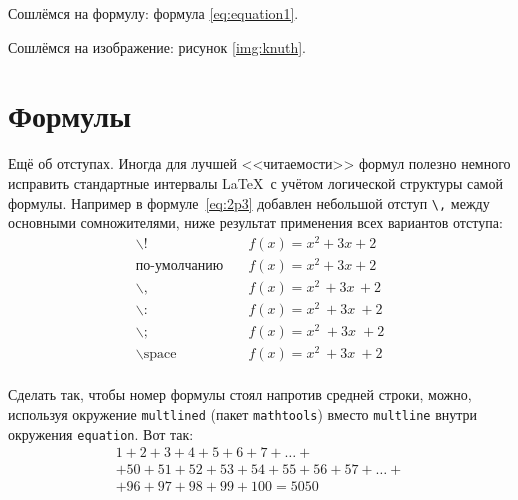 Сошлёмся на формулу: формула \eqref{eq:equation1}.

Сошлёмся на изображение: рисунок \ref{img:knuth}.


\section{Формулы} \label{sect1_3}


Ещё об отступах. Иногда для лучшей <<читаемости>> формул полезно
немного исправить стандартные интервалы \LaTeX\ с учётом логической
структуры самой формулы. Например в формуле~\ref{eq:2p3} добавлен
небольшой отступ \verb+\,+ между основными сомножителями, ниже
результат применения всех вариантов отступа:
\begin{align*}
\backslash! &\quad f(x) = x^2\! +3x\! +2 \\
  \mbox{по-умолчанию} &\quad f(x) = x^2+3x+2 \\
\backslash, &\quad f(x) = x^2\, +3x\, +2 \\
\backslash{:} &\quad f(x) = x^2\: +3x\: +2 \\
\backslash; &\quad f(x) = x^2\; +3x\; +2 \\
\backslash \mbox{space} &\quad f(x) = x^2\ +3x\ +2 \\
\end{align*}


Сделать так, чтобы номер формулы стоял напротив средней строки, можно, используя окружение \verb|multlined| (пакет \verb|mathtools|) вместо \verb|multline| внутри окружения \verb|equation|. Вот так:
\begin{equation} %
  \label{eq:equation3}
    \begin{multlined}
        1+ 2+3+4+5+6+7+\dots + \\ 
        + 50+51+52+53+54+55+56+57 + \dots + \\ 
        + 96+97+98+99+100=5050 
    \end{multlined}
\end{equation}


